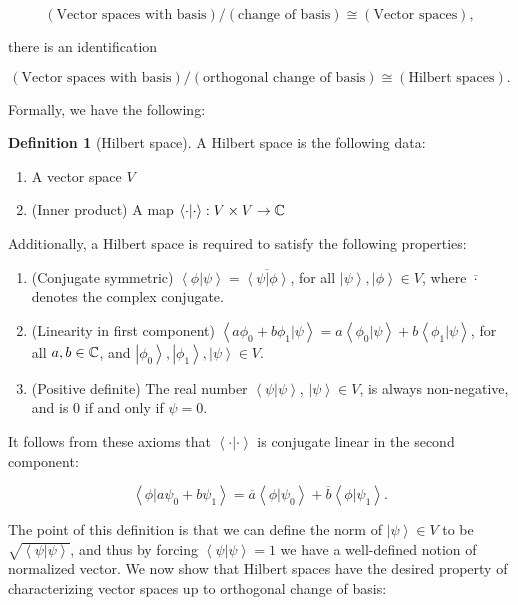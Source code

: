 \documentclass{article}
\theoremstyle{definition}
\newtheorem*{definition}{Definition}
\numberwithin{figure}{section}
\begin{document}
$$
\left(\text{Vector spaces with basis}\right)/\left(\text{change of basis}\right)\cong
\left(\text{Vector spaces}\right),
$$

there is an identification

$$
\left(\text{Vector spaces with basis}\right)/\left(\text{orthogonal change of basis}\right)\cong
\left(\text{Hilbert spaces}\right).
$$

Formally, we have the following:

\begin{definition}[Hilbert space] A Hilbert space is the following data:

\begin{enumerate}
\item A vector space $V$
\item (Inner product) A map $\left<\cdot |\cdot \right>:V\times V\to \mathbb{C}$
\end{enumerate}

Additionally, a Hilbert space is required to satisfy the following properties:

\begin{enumerate}
\item (Conjugate symmetric) $\left<\phi |\psi \right>=\overline{\left<\psi| \phi\right>}$, for all $\left|\psi\right>,\left|\phi\right>\in V$, where $\overline{\cdot}$ denotes the complex conjugate.
\item (Linearity in first component) $\left<a\phi_0+b\phi_1|\psi\right>=a\left<\phi_0|\psi\right>+b\left<\phi_1|\psi\right>$, for all $a,b\in \mathbb{C}$, and $\left|\phi_0\right>,\left|\phi_1\right>,\left|\psi\right>\in V$.
\item (Positive definite) The real number $\left<\psi|\psi\right>$, $\left|\psi\right>\in V$,  is always non-negative, and is $0$ if and only if $\psi=0$.
\end{enumerate}

\raggedleft\qedsymbol{}
\end{definition}

It follows from these axioms that $\left<\cdot | \cdot \right>$ is conjugate linear in the second component:

$$\left<\phi|a\psi_0+b\psi_1\right>=\overline{a}\left<\phi|\psi_0\right>+\overline{b}\left<\phi|\psi_1\right>.$$

The point of this definition is that we can define the norm of $\left|\psi\right>\in V$ to be $\sqrt{\left<\psi|\psi\right>}$, and thus by forcing $\left<\psi |\psi\right>=1$ we have a well-defined notion of normalized vector. We now show that Hilbert spaces have the desired property of characterizing vector spaces up to orthogonal change of basis:
\end{document}
